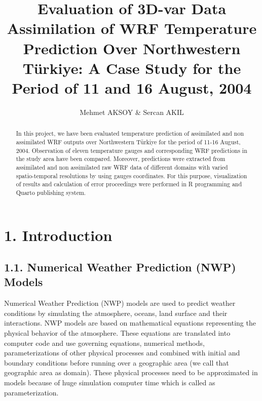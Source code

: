\documentclass[
  letterpaper,
  DIV=11,
  numbers=noendperiod,
  abstract]{scrartcl}
\title{Evaluation of 3D-var Data Assimilation of WRF Temperature
Prediction Over Northwestern Türkiye: A Case Study for the Period of 11
and 16 August, 2004}
\author{Mehmet AKSOY \& Sercan AKIL}
\date{}
\renewcommand*\contentsname{Table of contents}
\newcommand\contentsname{Table of contents}
\begin{document}
\maketitle
\begin{abstract}
In this project, we have been evaluated temperature prediction of
assimilated and non assimilated WRF outputs over Northwestern Türkiye
for the period of 11-16 August, 2004. Observation of eleven temperature
gauges and corresponding WRF predictions in the study area have been
compared. Moreover, predictions were extracted from assimilated and non
assimilated raw WRF data of different domains with varied
spatio-temporal resolutions by using gauges coordinates. For this
purpose, visualization of results and calculation of error proceedings
were performed in R programming and Quarto publishing system.
\end{abstract}
\ifdefined\Shaded\renewenvironment{Shaded}{\begin{tcolorbox}[frame hidden, boxrule=0pt, breakable, borderline west={3pt}{0pt}{shadecolor}, sharp corners, colback={codebgcolor}, enhanced]}{\end{tcolorbox}}\fi

\renewcommand*\contentsname{Table of contents}
{
\hypersetup{linkcolor=}
\setcounter{tocdepth}{3}
\tableofcontents
}
\listoffigures
\listoftables
\hypertarget{introduction}{%
\section{1. Introduction}\label{introduction}}

\hypertarget{numerical-weather-prediction-nwp-models}{%
\subsection{1.1. Numerical Weather Prediction (NWP)
Models}\label{numerical-weather-prediction-nwp-models}}

Numerical Weather Prediction (NWP) models are used to predict weather
conditions by simulating the atmosphere, oceans, land surface and their
interactions. NWP models are based on mathematical equations
representing the physical behavior of the atmosphere. These equations
are translated into computer code and use governing equations, numerical
methods, parameterizations of other physical processes and combined with
initial and boundary conditions before running over a geographic area
(we call that geographic area as domain). These physical processes need
to be approximated in models because of huge simulation computer time
which is called as parameterization.
\end{document}
